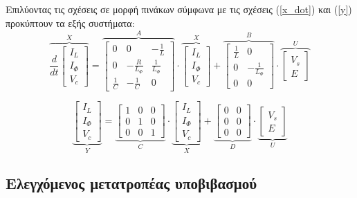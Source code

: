 \clearpage
\noindent
Επιλύοντας τις σχέσεις σε μορφή πινάκων σύμφωνα με τις σχέσεις (\ref{x_dot}) και (\ref{y}) προκύπτουν τα εξής συστήματα:
 \begin{equation*}
 	\overbrace{
	 	\frac{d}{dt} 
	 	\begin{bmatrix}
	 		I_L\\
	 		I_{\Phi}\\
	 		V_c
	 	\end{bmatrix}
	 }^{\dot{X}}
 	=
 	\overbrace{
	 	\begin{bmatrix}
						0 		& 					0 			 & -\frac{1}{L}\\
			            0       & -\frac{R}{L_{\Phi}} & \frac{1}{L_{\Phi}}\\
			\frac{1}{C}  & 		   -\frac{1}{C}      & 				0
	 	\end{bmatrix}
	 }^A
 	\cdot
 	\overbrace{
	 	\begin{bmatrix}
			I_L\\
			I_{\Phi}\\
			V_c
		\end{bmatrix}
	}^X
	+ 	
	\overbrace{
		\begin{bmatrix}
			 \frac{1}{L}  &	    			0 			\\
					0           &  -\frac{1}{L_{\Phi}}\\
					0		    & 		  			0
		\end{bmatrix}
	}^B
	\cdot
	\overbrace{
		\begin{bmatrix}
			V_s\\
			E		
		\end{bmatrix}
	}^U
\end{equation*} 

\begin{equation*}
	\underbrace{
		\begin{bmatrix}
			I_L\\
			I_{\Phi}\\
			V_c
		\end{bmatrix}
	}_Y
	=
	\underbrace{
		\begin{bmatrix}
			1 & 0 & 0\\
			0 & 1 & 0\\
			0 & 0 & 1
		\end{bmatrix}
	}_C
	\cdot
	\underbrace{
		\begin{bmatrix}
			I_L\\
			I_{\Phi}\\
			V_c
		\end{bmatrix}
	}_X
	+ 
	\underbrace{	
		\begin{bmatrix}
			0 & 0 \\
			0 & 0 \\
			0 & 0
		\end{bmatrix}
	}_D
	\cdot
	\underbrace{
		\begin{bmatrix}
			V_s\\
			E		
		\end{bmatrix}
	}_U
\end{equation*}
\clearpage
\subsection{Ελεγχόμενος μετατροπέας υποβιβασμού}